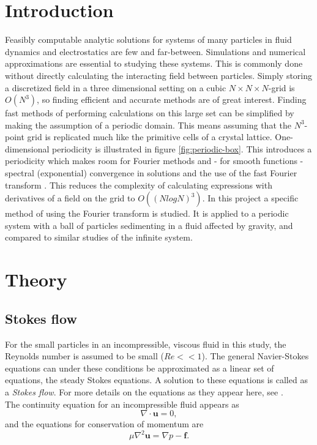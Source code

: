 \documentclass[a4paper,
twoside=false,abstract=false,numbers=noenddot,
titlepage=false,headings=small,parskip=half,version=last]{scrartcl}
\begin{document}
\section{Introduction}
Feasibly computable analytic solutions for systems of many particles in fluid dynamics and electrostatics are few and far-between.
Simulations and numerical approximations are essential to studying these systems.
This is commonly done without directly calculating the interacting field between particles.
Simply storing a discretized field in a three dimensional setting on a cubic $N\times N\times N$-grid is $O(N^3)$, so finding efficient and accurate methods are of great interest.
Finding fast methods of performing calculations on this large set can be simplified by making the assumption of a periodic domain.
This means assuming that the $N^3$-point grid is replicated much like the primitive cells of a crystal lattice.
One-dimensional periodicity is illustrated in figure \ref{fig:periodic-box}.
This introduces a periodicity which makes room for Fourier methods and - for smooth functions - spectral (exponential) convergence in solutions and the use of the fast Fourier transform \cite{fluctuatesediment}. This reduces the complexity of calculating expressions with derivatives of a field on the grid to $O\left((NlogN)^3\right)$. In this project a specific method of using the Fourier transform is studied.
It is applied to a periodic system with a ball of particles sedimenting in a fluid affected by gravity, and compared to similar studies of the infinite system.

\section{Theory}
\subsection{Stokes flow}
For the small particles in an incompressible, viscous fluid in this study, the Reynolds number is assumed to be small ($Re<<1$). The general Navier-Stokes equations can under these conditions be approximated as a linear set of equations, the steady Stokes equations. A solution to these equations is called as a \emph{Stokes flow}. For more details on the equations as they appear here, see \cite{guazzellibook}.\\
The continuity equation for an incompressible fluid appears as
\begin{equation}
\nabla \cdot \mathbf{u} = 0, \label{eq:incompressible}
\end{equation}
and the equations for conservation of momentum are
\begin{equation}
\mu \nabla^2 \mathbf{u} = \nabla p - \mathbf{f}. \label{eq:stokesequations}
\end{equation}
\end{document}
